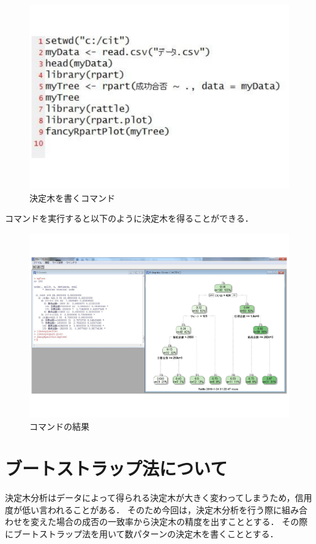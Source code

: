 \begin{figure}[H]
\centering
\includegraphics[width=13cm]{figure21.pdf}
\caption{決定木を書くコマンド}\label{sannp}
\end{figure}

コマンドを実行すると以下のように決定木を得ることができる．
\begin{figure}[H]
\centering
\includegraphics[width=13cm]{figure22.pdf}
\caption{コマンドの結果}\label{sannp}
\end{figure}

\section{ブートストラップ法について}
決定木分析はデータによって得られる決定木が大きく変わってしまうため，信用度が低い言われることがある．
そのため今回は，決定木分析を行う際に組み合わせを変えた場合の成否の一致率から決定木の精度を出すこととする．
その際にブートストラップ法を用いて数パターンの決定木を書くこととする．

